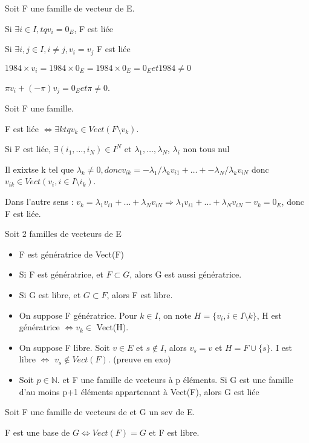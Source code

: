 \documentclass[french]{yLectureNote}
\newcommand{\N}[0]{\mathbb{N}}
\begin{document}
\begin{proposition}
Soit F une famille de vecteur de E.

Si \(\exists i\in I, tq v_i = 0_E\), F est liée

Si \(\exists i,j\in I, i\neq j, v_i=v_j\) F est liée
\end{proposition}
\begin{myproof}
\(1984\times v_i  = 1984 \times 0_E = 1984\times 0_E = 0_E et 1984\neq 0\)

\(\pi v_i + (-\pi)v_j = 0_E et \pi\neq 0\).
\end{myproof}
\begin{proposition}
Soit F une famille.

F est liée \(\iff \exists k tq v_k \in Vect(F \setminus v_k)\).
\end{proposition}
\begin{proposition}
Si F est liée, \(\exists (i_1,\dots, i_N)\in I^N\) et \(\lambda_1,\dots,\lambda_N\), \(\lambda_i\) non tous nul


\end{proposition}
\begin{myproof}
Il exixtse k tel que \(\lambda_k\neq 0, donc v_{ik} = -\lambda_1/\lambda_k v_{i1}+\dots+-\lambda_N/\lambda_k v_{iN}\) donc \(v_{ik}\in Vect(v_i, i\in I \setminus {i_k})\).

Dans l'autre sens : \(v_k = \lambda_1v_{i1}+\dots+\lambda_Nv_{iN}\Rightarrow  \lambda_1v_{i1}+\dots+\lambda_Nv_{iN} - v_k=0_E\), donc F est liée.
\end{myproof}
\begin{proposition}
Soit 2 familles de vecteurs de E

\begin{itemize}
 \item F est génératrice de Vect(F)
 \item Si F est génératrice, et \(F\subset G\), alors G est aussi génératrice.
 \item Si G est libre, et \(G\subset F\), alors F est libre.
 \item On suppose F génératrice. Pour \(k\in I\), on note \(H =\{v_i, i\in I \setminus k\}\),  H est génératrice  \(\iff v_k\in\) Vect(H).
 \item On suppose F libre. Soit \(v \in E\) et \(s\notin I\), alors \(v_s=v\) et \(H = F\cup \{s\}\). I est libre \(\iff\) \(v_s \notin Vect(F)\). (preuve en exo)
 \item Soit \(p\in \N\). et F une famille de vecteurs à p éléments. Si G est une famille d'au moins p+1 éléments appartenant à Vect(F), alors G est liée
\end{itemize}
\end{proposition}
\begin{definition}[Base]
Soit F une famille de vecteurs de et G un sev de E.

F est une base de \(G \iff Vect(F) = G\) et F est libre.
\end{definition}
\end{document}
